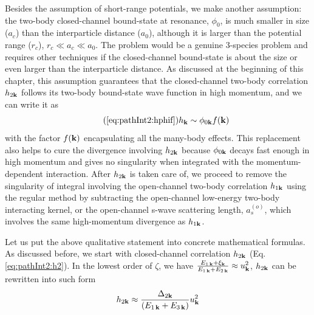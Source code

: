 Besides the assumption of short-range potentials, we make another assumption:  the  two-body closed-channel bound-state at resonance, $\phi_{0}$, is much smaller in size ($a_{c}$) than the interparticle distance ($a_{0}$), although it is  larger than the potential range ($r_{c}$),    $r_{c}\ll{}a_{c}\ll{}a_{0}$.  The problem would be a genuine 3-species problem and requires other techniques if the closed-channel bound-state is about the size  or even larger than the interparticle distance. As discussed at the beginning of this chapter, this assumption guarantees that the closed-channel two-body correlation $h_{2\mathbf{k}}$ follows its two-body bound-state wave function in high momentum, and  we can write it as 
\begin{equation}\tag{\ref{eq:pathInt2:hphif}}
h_{\vk}\sim\phi_{0\vk}f(\vk)
\end{equation}
with the factor $f(\mathbf{k})$ encapsulating all the many-body effects. This replacement also helps to  cure the divergence involving $h_{2\mathbf{k}}$ because $\phi_{0\mathbf{k}}$ decays fast enough in high momentum and gives no singularity when integrated with the momentum-dependent interaction.   After $h_{2\mathbf{k}}$ is taken care of, we proceed to remove the singularity of integral involving the open-channel two-body correlation $h_{1\mathbf{k}}$ using the regular method by subtracting the open-channel low-energy two-body interacting kernel, or the open-channel s-wave scattering length, $a_{s}^{(o)}$, which involves  the same high-momentum divergence as $h_{1\mathbf{k}}$. 



Let us put the above qualitative statement into concrete mathematical formulas.   As discussed before, we start with  closed-channel correlation $h_{2\mathbf{k}}$ (Eq. \ref{eq:pathInt2:h2}). In the lowest order of ${\zeta}$, we have $\frac{E_{1\,\mathbf{k}}+\xi_{\mathbf{k}}}{E_{1\,\mathbf{k}}+E_{2\,\mathbf{k}}}\approx{}u_{\mathbf{k}}^{2}$, $h_{2\mathbf{k}}$ can be rewritten into such form
\begin{equation}\label{eq:pathInt2:h2D2}
 h_{2\mathbf{k}}\approx\frac{\Delta_{2\mathbf{k}}}{(E_{1\,\mathbf{k}}+E_{3\,\mathbf{k}})}u_{\mathbf{k}}^{2}
\end{equation}

